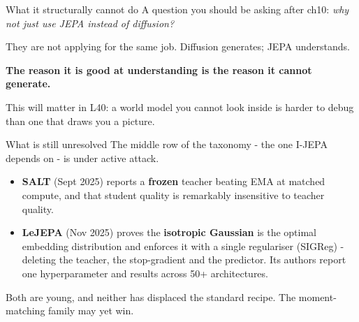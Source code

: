 \documentclass[aspectratio=169]{beamer}
\begin{document}
\begin{frame}{What it structurally cannot do}
  \small
  A question you should be asking after ch10: \emph{why not just use JEPA instead of
  diffusion?}
  \vskip 10pt
  \begin{center}
  \end{center}
  \vskip 10pt
  They are not applying for the same job. Diffusion generates; JEPA understands.
  \vskip 8pt
  \begin{center}
    \small\color{armred}\textbf{The reason it is good at understanding is the reason it
    cannot generate.}
  \end{center}
  \vskip 6pt
  \footnotesize\color{gray}This will matter in L40: a world model you cannot look inside
  is harder to debug than one that draws you a picture.
\end{frame}

\begin{frame}{What is still unresolved}
  \small
  The middle row of the taxonomy - the one I-JEPA depends on - is under active attack.
  \vskip 8pt
  \begin{itemize}\small
    \item \textbf{SALT} (Sept 2025) reports a \textbf{frozen} teacher beating EMA at
      matched compute, and that student quality is remarkably insensitive to teacher
      quality.
    \item \textbf{LeJEPA} (Nov 2025) proves the \textbf{isotropic Gaussian} is the optimal
      embedding distribution and enforces it with a single regulariser (SIGReg) - deleting
      the teacher, the stop-gradient and the predictor. Its authors report one
      hyperparameter and results across 50+ architectures.
  \end{itemize}
  \vskip 8pt
  \begin{center}
  \end{center}
  \vskip 4pt
  \footnotesize\color{gray}Both are young, and neither has displaced the standard recipe.
  The moment-matching family may yet win.
\end{frame}
\end{document}

